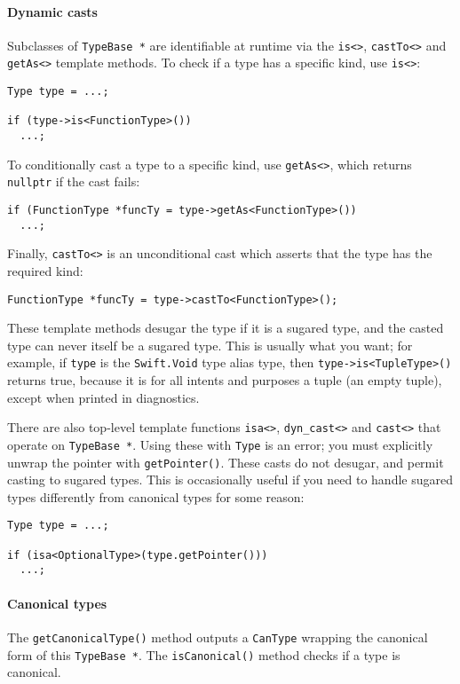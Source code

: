 \documentclass[a4paper,headsepline,bibliography=totoc,toc=flat,fleqn,twoside=semi]{scrbook}
\theoremstyle{definition}
\theoremstyle{definition}
\theoremstyle{definition}
\begin{document}
\paragraph{Dynamic casts}
Subclasses of \texttt{TypeBase *} are identifiable at runtime via the \verb|is<>|, \verb|castTo<>| and \verb|getAs<>| template methods. To check if a type has a specific kind, use \verb|is<>|:
\begin{Verbatim}
Type type = ...;

if (type->is<FunctionType>())
  ...;
\end{Verbatim}
To conditionally cast a type to a specific kind, use \verb|getAs<>|, which returns \verb|nullptr| if the cast fails:
\begin{Verbatim}
if (FunctionType *funcTy = type->getAs<FunctionType>())
  ...;
\end{Verbatim}
Finally, \verb|castTo<>| is an unconditional cast which asserts that the type has the required kind:
\begin{Verbatim}
FunctionType *funcTy = type->castTo<FunctionType>();
\end{Verbatim}
These template methods desugar the type if it is a sugared type, and the casted type can never itself be a sugared type. This is usually what you want; for example, if \texttt{type} is the \texttt{Swift.Void} type alias type, then \texttt{type->is<TupleType>()} returns true, because it is for all intents and purposes a tuple (an empty tuple), except when printed in diagnostics.

There are also top-level template functions \verb|isa<>|, \verb|dyn_cast<>| and \verb|cast<>| that operate on \texttt{TypeBase *}. Using these with \texttt{Type} is an error; you must explicitly unwrap the pointer with \texttt{getPointer()}. These casts do not desugar, and permit casting to sugared types. This is occasionally useful if you need to handle sugared types differently from canonical types for some reason:
\begin{Verbatim}
Type type = ...;

if (isa<OptionalType>(type.getPointer()))
  ...;
\end{Verbatim}

\paragraph{Canonical types}
The \texttt{getCanonicalType()} method outputs a \texttt{CanType} wrapping the canonical form of this \texttt{TypeBase *}. The \texttt{isCanonical()} method checks if a type is canonical.
\end{document}
